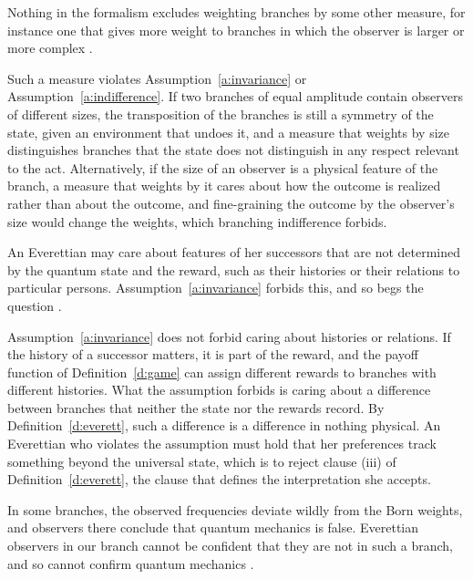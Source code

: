 \documentclass{situationist-preprint}
\begin{document}
\begin{objection}\label{o:albert}
Nothing in the formalism excludes weighting branches by some other measure, for instance one that gives more weight to branches in which the observer is larger or more complex \citep{Albert2010}.
\end{objection}

\begin{reply}
Such a measure violates Assumption~\ref{a:invariance} or Assumption~\ref{a:indifference}. If two branches of equal amplitude contain observers of different sizes, the transposition of the branches is still a symmetry of the state, given an environment that undoes it, and a measure that weights by size distinguishes branches that the state does not distinguish in any respect relevant to the act. Alternatively, if the size of an observer is a physical feature of the branch, a measure that weights by it cares about how the outcome is realized rather than about the outcome, and fine-graining the outcome by the observer's size would change the weights, which branching indifference forbids.
\end{reply}

\begin{objection}\label{o:jansson}
An Everettian may care about features of her successors that are not determined by the quantum state and the reward, such as their histories or their relations to particular persons. Assumption~\ref{a:invariance} forbids this, and so begs the question \citep{Jansson2016}.
\end{objection}

\begin{reply}
Assumption~\ref{a:invariance} does not forbid caring about histories or relations. If the history of a successor matters, it is part of the reward, and the payoff function of Definition~\ref{d:game} can assign different rewards to branches with different histories. What the assumption forbids is caring about a difference between branches that neither the state nor the rewards record. By Definition~\ref{d:everett}, such a difference is a difference in nothing physical. An Everettian who violates the assumption must hold that her preferences track something beyond the universal state, which is to reject clause (iii) of Definition~\ref{d:everett}, the clause that defines the interpretation she accepts.
\end{reply}

\begin{objection}[Confirmation]\label{o:kent}
In some branches, the observed frequencies deviate wildly from the Born weights, and observers there conclude that quantum mechanics is false. Everettian observers in our branch cannot be confident that they are not in such a branch, and so cannot confirm quantum mechanics \citep{Kent2010}.
\end{objection}
\end{document}
